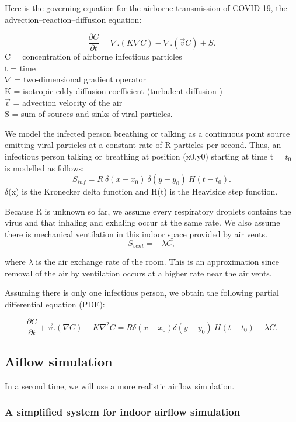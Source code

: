 \documentclass[a4paper,10pt]{article}
\begin{document}
Here is the governing equation for the airborne transmission of COVID-19, the advection–reaction–diffusion equation:

$$ \frac{\partial C}{\partial t} = \nabla . (K  \nabla  C) - \nabla . (\overrightarrow{v}  C) + S.$$
C = concentration of airborne infectious particles \\
t = time \\
$\nabla$ = two-dimensional gradient operator \\
K = isotropic eddy diffusion coefficient (turbulent diffusion ) \\
$\overrightarrow{v}$ = advection velocity of the air \\
S = sum of sources and sinks of viral particles.

We model the infected person breathing or talking as a continuous point source emitting viral particles at a constant rate of R particles per second. Thus, an infectious person talking or breathing at position (x0,y0) starting at time t = $t_0$ is modelled as follows:
$$ S_{inf} = R \ \delta(x-x_0) \ \delta(y-y_0) \ H(t-t_0). $$
$\delta$(x) is the Kronecker delta function and H(t) is the Heaviside step function.

Because R is unknown so far, we assume every respiratory droplets contains the virus and that inhaling and exhaling occur at the same rate.
We also assume there is mechanical ventilation in this indoor space provided by air vents.
$$S_{vent} = - \lambda C, $$

where $\lambda$ is the air exchange rate of the room. This is an approximation since removal of the air by ventilation occurs at a higher rate near the air vents.

Assuming there is only one infectious person, we obtain the following partial differential equation (PDE):

$$ \frac{\partial C}{\partial t} + \overrightarrow{v} . (\nabla C) - K  \nabla^2  C =
R \delta(x-x_0) \delta(y-y_0) \ H(t-t_0) - \lambda C.$$

\subsection*{Aiflow simulation}

In a second time, we will use a more realistic airflow simulation.

\subsubsection*{A simplified system for indoor airflow simulation}
\end{document}
